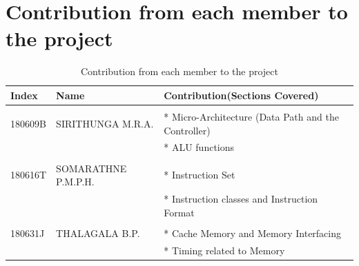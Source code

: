 \documentclass[a4paper,11pt]{article}
\begin{document}

\tableofcontents
\section*{\textbf{{Contribution from each member to the project}}}

\begin{table}[!h]
	\centering

		\begin{tabular}{|l|l|l|}
			\hline
			\textbf{Index}	&\textbf{Name} 	&\textbf{Contribution(Sections Covered)}\\ \hline
			&&\\
		180609B  	&SIRITHUNGA M.R.A. &* Micro-Architecture (Data Path and the Controller)\\
		&&* ALU functions\\ \hline&&\\

 		180616T  	&SOMARATHNE P.M.P.H. &* Instruction Set\\
 		&&*  Instruction classes and Instruction Format\\\hline&&\\

 		180631J		&THALAGALA B.P.&* Cache Memory and Memory Interfacing\\
 		&&*  Timing related to Memory\\\hline
		\end{tabular}

			\caption{Contribution from each member to the project}
\end{table}

\pagebreak
\end{document}
